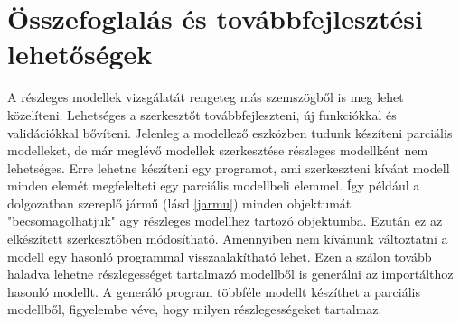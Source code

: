 \chapter{Összefoglalás és továbbfejlesztési lehetőségek}
A részleges modellek vizsgálatát rengeteg más szemszögből is meg lehet közelíteni. Lehetséges a szerkesztőt továbbfejleszteni, új funkciókkal és validációkkal bővíteni. 
Jelenleg a modellező eszközben tudunk készíteni parciális modelleket, de már meglévő modellek szerkesztése részleges modellként nem lehetséges. Erre lehetne készíteni egy programot, ami szerkeszteni kívánt modell minden elemét megfelelteti egy parciális modellbeli elemmel. Így például a dolgozatban szereplő jármű (lásd \autoref{jarmu}) minden objektumát "becsomagolhatjuk" agy részleges modellhez tartozó objektumba. Ezután ez az elkészített szerkesztőben módosítható. Amennyiben nem kívánunk változtatni a modell egy hasonló programmal visszaalakítható lehet. Ezen a szálon tovább haladva lehetne részlegességet tartalmazó modellből is generálni az importálthoz hasonló modellt. A generáló program többféle modellt készíthet a parciális modellből, figyelembe véve, hogy milyen részlegességeket tartalmaz.
